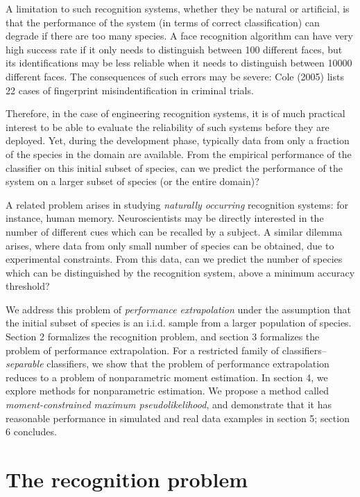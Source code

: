 \documentclass{article}
\begin{document}
A limitation to such recognition systems, whether they be natural or
artificial, is that the performance of the system (in terms of correct
classification) can degrade if there are too many species.  A face
recognition algorithm can have very high success rate if it only needs
to distinguish between 100 different faces, but its identifications
may be less reliable when it needs to distinguish between 10000
different faces.  The consequences of such errors may be severe: Cole
(2005) lists 22 cases of fingerprint misindentification in criminal
trials.

Therefore, in the case of engineering recognition systems, it is of
much practical interest to be able to evaluate the reliability of such
systems before they are deployed.  Yet, during the development phase,
typically data from only a fraction of the species in the domain are
available.  From the empirical performance of the classifier on this
initial subset of species, can we predict the performance of the
system on a larger subset of species (or the entire domain)?

A related problem arises in studying \emph{naturally occurring}
recognition systems: for instance, human memory.  Neuroscientists may
be directly interested in the number of different cues which can be
recalled by a subject.  A similar dilemma arises, where data from only
small number of species can be obtained, due to experimental
constraints.  From this data, can we predict the number of species
which can be distinguished by the recognition system, above a minimum
accuracy threshold?

We address this problem of \emph{performance extrapolation} under the
assumption that the initial subset of species is an i.i.d. sample from
a larger population of species.  Section 2 formalizes the recognition
problem, and section 3 formalizes the problem of performance
extrapolation.  For a restricted family of
classifiers--\emph{separable} classifiers, we show that the problem of
performance extrapolation reduces to a problem of nonparametric moment
estimation.  In section 4, we explore methods for nonparametric
estimation.  We propose a method called \emph{moment-constrained
  maximum pseudolikelihood}, and demonstrate that it has reasonable
performance in simulated and real data examples in section 5; section
6 concludes.


\section{The recognition problem}
\end{document}
